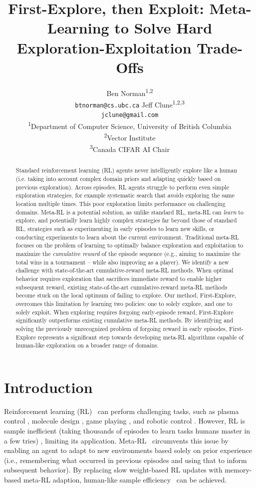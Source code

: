 \documentclass{article}
\title{First-Explore, then Exploit: Meta-Learning to Solve Hard Exploration-Exploitation Trade-Offs}
\author{%
  Ben Norman\textsuperscript{1,2} \\ \texttt{btnorman@cs.ubc.ca} 
  \And Jeff Clune\textsuperscript{1,2,3} \\ \texttt{jclune@gmail.com}
  \And
  \vspace{-0.6cm}\\ 
  \textsuperscript{1}Department of Computer Science, University of British Columbia\\
  \textsuperscript{2}Vector Institute\\
  \textsuperscript{3}Canada CIFAR AI Chair\\
}
\newif\ifcomment
\begin{document}
\maketitle

\begin{abstract}
Standard reinforcement learning (RL) agents never intelligently explore like a human (i.e. taking into account complex domain priors and adapting quickly based on previous exploration). Across episodes, RL agents struggle to perform even simple exploration strategies, for example systematic search that avoids exploring the same location multiple times. This poor exploration limits performance on challenging domains. Meta-RL is a potential solution, as unlike standard RL, meta-RL can \emph{learn} to explore, and potentially learn highly complex strategies far beyond those of standard RL, strategies such as experimenting in early episodes to learn new skills, or conducting experiments to learn about the current environment.
%
Traditional meta-RL focuses on the problem of learning to optimally balance exploration and exploitation to maximize the \emph{cumulative reward} of the episode sequence (e.g., aiming to maximize the total wins in a tournament -- while also improving as a player).
%
We identify a new challenge with state-of-the-art cumulative-reward meta-RL methods.
%
When optimal behavior requires exploration that sacrifices immediate reward to enable higher subsequent reward, existing state-of-the-art cumulative-reward meta-RL methods become stuck on the local optimum of failing to explore.
%
Our method, First-Explore, overcomes this limitation by learning two policies: one to solely explore, and one to solely exploit. When exploring requires forgoing early-episode reward, First-Explore significantly outperforms existing cumulative meta-RL methods. By identifying and solving the previously unrecognized problem of forgoing reward in early episodes, First-Explore represents a significant step towards developing meta-RL algorithms capable of human-like exploration on a broader range of domains.
\end{abstract}

\section{Introduction}\label{intro}
Reinforcement learning (RL)~\citep{sutton_bach_barto_2018} can perform challenging tasks, such as plasma control \citep{plasma}, molecule design \citep{moleculedesign}, game playing \citep{alphago}, and robotic control \citep{openai2019rubiks}. However, RL is sample inefficient (taking thousands of episodes to learn tasks humans master in a few tries) \citep{mnih2013playing}, limiting its application. Meta-RL~\citep{VariBAD, rl2, rl2alt, hyperx, liu2021decoupling, adaptiveagentteam2023humantimescale} circumvents this issue by enabling an agent to adapt to new environments based solely on prior experience (i.e., remembering what occurred in previous episodes and using that to inform subsequent behavior). By replacing slow weight-based RL updates with memory-based meta-RL adaption, human-like sample efficiency~\citep{adaptiveagentteam2023humantimescale} can be achieved.
\end{document}

